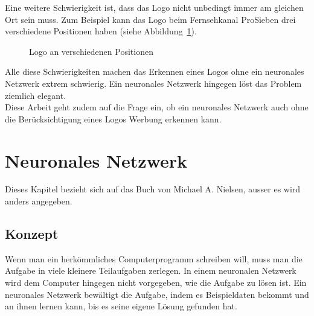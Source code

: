 \documentclass[12pt,a4paper]{report}
\begin{document}
Eine weitere Schwierigkeit ist, dass das Logo nicht unbedingt immer am gleichen Ort sein muss.
Zum Beispiel kann das Logo beim Fernsehkanal ProSieben drei verschiedene Positionen haben (siehe Abbildung~\ref{fig:logo3}).
\begin{figure}[h]%
    \centering
    \qquad
    \qquad
    \caption{Logo an verschiedenen Positionen}%
    \label{fig:logo3}%
\end{figure}
Alle diese Schwierigkeiten machen das Erkennen eines Logos ohne ein neuronales Netzwerk extrem schwierig.
Ein neuronales Netzwerk hingegen löst das Problem ziemlich elegant.\bigskip\\
Diese Arbeit geht zudem auf die Frage ein, ob ein neuronales Netzwerk auch ohne die Berücksichtigung eines Logos Werbung erkennen kann.


\chapter{Neuronales Netzwerk}
\label{ch:neuronalesNetzwerk}
Dieses Kapitel bezieht sich auf das Buch von Michael A. Nielsen\cite{neuralbook}, ausser es wird anders angegeben.
\section{Konzept}\label{sec:konzept}
Wenn man ein herkömmliches Computerprogramm schreiben will, muss man die Aufgabe in viele kleinere Teilaufgaben zerlegen.
In einem neuronalen Netzwerk wird dem Computer hingegen nicht vorgegeben, wie die Aufgabe zu lösen ist.
Ein neuronales Netzwerk bewältigt die Aufgabe, indem es Beispieldaten bekommt und an ihnen lernen kann, bis es seine eigene Lösung gefunden hat.
\end{document}
